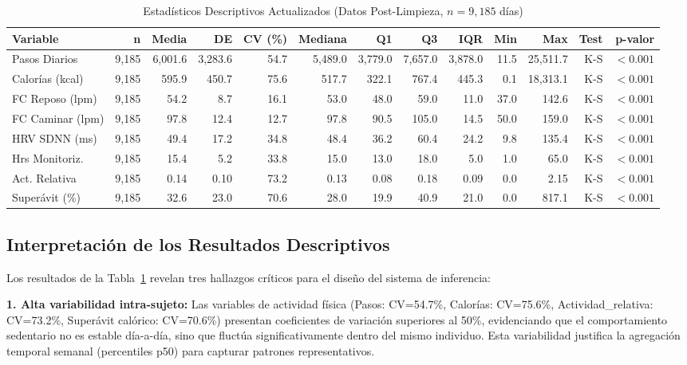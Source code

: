\documentclass[12pt,letterpaper,twoside]{report}
\begin{document}
\begin{landscape}
\begin{table}[htbp]
\centering
\caption{Estadísticos Descriptivos Actualizados (Datos Post-Limpieza, $n=9,185$ días)}
\label{tab:descriptive_daily}
\footnotesize
\begin{tabular}{lrrrrrrrrrrrr}
\toprule
\textbf{Variable} & \textbf{n} & \textbf{Media} & \textbf{DE} & \textbf{CV (\%)} & \textbf{Mediana} & \textbf{Q1} & \textbf{Q3} & \textbf{IQR} & \textbf{Min} & \textbf{Max} & \textbf{Test} & \textbf{p-valor} \\
\midrule
Pasos Diarios & 9,185 & 6,001.6 & 3,283.6 & 54.7 & 5,489.0 & 3,779.0 & 7,657.0 & 3,878.0 & 11.5 & 25,511.7 & K-S & $<0.001$ \\
Calorías (kcal) & 9,185 & 595.9 & 450.7 & 75.6 & 517.7 & 322.1 & 767.4 & 445.3 & 0.1 & 18,313.1 & K-S & $<0.001$ \\
FC Reposo (lpm) & 9,185 & 54.2 & 8.7 & 16.1 & 53.0 & 48.0 & 59.0 & 11.0 & 37.0 & 142.6 & K-S & $<0.001$ \\
FC Caminar (lpm) & 9,185 & 97.8 & 12.4 & 12.7 & 97.8 & 90.5 & 105.0 & 14.5 & 50.0 & 159.0 & K-S & $<0.001$ \\
HRV SDNN (ms) & 9,185 & 49.4 & 17.2 & 34.8 & 48.4 & 36.2 & 60.4 & 24.2 & 9.8 & 135.4 & K-S & $<0.001$ \\
Hrs Monitoriz. & 9,185 & 15.4 & 5.2 & 33.8 & 15.0 & 13.0 & 18.0 & 5.0 & 1.0 & 65.0 & K-S & $<0.001$ \\
Act. Relativa & 9,185 & 0.14 & 0.10 & 73.2 & 0.13 & 0.08 & 0.18 & 0.09 & 0.0 & 2.15 & K-S & $<0.001$ \\
Superávit (\%) & 9,185 & 32.6 & 23.0 & 70.6 & 28.0 & 19.9 & 40.9 & 21.0 & 0.0 & 817.1 & K-S & $<0.001$ \\
\bottomrule
\end{tabular}
\end{table}
\end{landscape}

\subsection{Interpretación de los Resultados Descriptivos}

Los resultados de la Tabla~\ref{tab:descriptive_daily} revelan tres hallazgos críticos para el diseño del sistema de inferencia:

\textbf{1. Alta variabilidad intra-sujeto:} Las variables de actividad física (Pasos: CV=54.7\%, Calorías: CV=75.6\%, Actividad\_relativa: CV=73.2\%, Superávit calórico: CV=70.6\%) presentan coeficientes de variación superiores al 50\%, evidenciando que el comportamiento sedentario no es estable día-a-día, sino que fluctúa significativamente dentro del mismo individuo. Esta variabilidad justifica la agregación temporal semanal (percentiles p50) para capturar patrones representativos.
\end{document}
